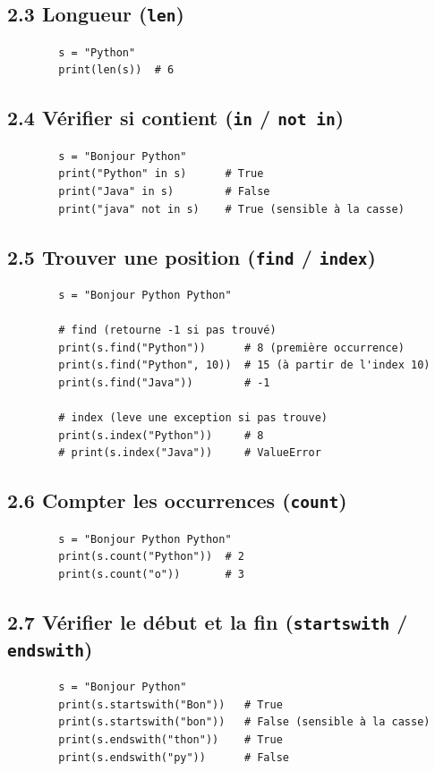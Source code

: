 \documentclass[12pt,a4paper]{article}
\begin{document}
	\subsection*{\color{cyan}2.3 Longueur (\texttt{len})}
	\begin{lstlisting}
		s = "Python"
		print(len(s))  # 6
	\end{lstlisting}
	
	\subsection*{\color{cyan}2.4 Vérifier si contient (\texttt{in} / \texttt{not in})}
	\begin{lstlisting}
		s = "Bonjour Python"
		print("Python" in s)      # True
		print("Java" in s)        # False
		print("java" not in s)    # True (sensible à la casse)
	\end{lstlisting}
	
	\subsection*{\color{cyan}2.5 Trouver une position (\texttt{find} / \texttt{index})}
	\begin{lstlisting}
		s = "Bonjour Python Python"
		
		# find (retourne -1 si pas trouvé)
		print(s.find("Python"))      # 8 (première occurrence)
		print(s.find("Python", 10))  # 15 (à partir de l'index 10)
		print(s.find("Java"))        # -1
		
		# index (leve une exception si pas trouve)
		print(s.index("Python"))     # 8
		# print(s.index("Java"))     # ValueError
	\end{lstlisting}
	
	\subsection*{\color{cyan}2.6 Compter les occurrences (\texttt{count})}
	\begin{lstlisting}
		s = "Bonjour Python Python"
		print(s.count("Python"))  # 2
		print(s.count("o"))       # 3
	\end{lstlisting}
	
	\subsection*{\color{cyan}2.7 Vérifier le début et la fin (\texttt{startswith} / \texttt{endswith})}
	\begin{lstlisting}
		s = "Bonjour Python"
		print(s.startswith("Bon"))   # True
		print(s.startswith("bon"))   # False (sensible à la casse)
		print(s.endswith("thon"))    # True
		print(s.endswith("py"))      # False
	\end{lstlisting}
	
\end{document}
